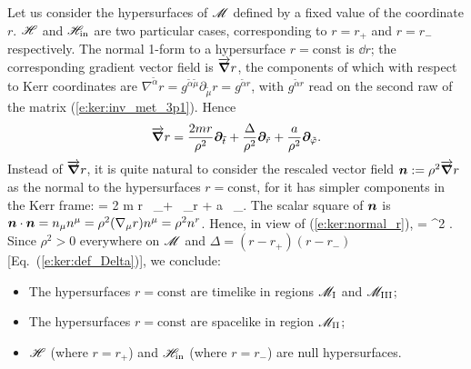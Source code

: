 Let us consider the hypersurfaces of $\mathscr{M}$ defined by a fixed value of
the coordinate $r$. $\mathscr{H}$ and $\mathscr{H}_{\rm in}$ are two particular cases,
corresponding to $r=r_+$ and $r=r_-$ respectively.
The normal 1-form to a hypersurface $r=\mathrm{const}$ is $\dd r$; the corresponding
gradient vector field is $\overrightarrow{\bm{\nabla}} r$, the components of which with respect
to Kerr coordinates are
$\nabla^{\tilde{\alpha}} r = g^{\tilde{\alpha}\tilde{\mu}} \partial_{\tilde{\mu}} r
= g^{\tilde{\alpha} r}$, with $g^{\tilde{\alpha} r}$ read on the second raw
of the matrix (\ref{e:ker:inv_met_3p1}). Hence
\[
    \overrightarrow{\bm{\nabla}} r = \frac{2m r}{\rho^2} \bm{\partial}_{\tilde t}
        +  \frac{\Delta}{\rho^2}\bm{\partial}_{\tilde r}
        +  \frac{a}{\rho^2} \bm{\partial}_{\tilde\varphi} .
\]
Instead of $ \overrightarrow{\bm{\nabla}} r$, it is quite natural to consider the rescaled vector field
$\bm{n} := \rho^2 \overrightarrow{\bm{\nabla}} r$
as the normal to the hypersurfaces $r=\mathrm{const}$, for it
has simpler components in the Kerr frame:
\be \label{e:ker:normal_r}
     = 2 m r \, \wpar_\ti + \Delta \, \wpar_{\tilde r} + a \, \wpar_\tph .
\ee
The scalar square of $\bm{n}$ is
$\bm{n}\cdot\bm{n} = n_\mu n^\mu = \rho^2 (\nabla_\mu r) n^\mu = \rho^2 n^r$.
Hence, in view of (\ref{e:ker:normal_r}),
\be
    \cdot{} = \rho^2 \Delta .
\ee
Since $\rho^2>0$ everywhere on $\mathscr{M}$ and $\Delta = (r-r_+)(r-r_-)$ [Eq.~(\ref{e:ker:def_Delta})], we conclude:
\begin{prop}
\begin{itemize}
\item The hypersurfaces $r=\mathrm{const}$ are timelike in regions $\mathscr{M}_{\rm I}$ and $\mathscr{M}_{\rm III}$;
\item The hypersurfaces $r=\mathrm{const}$ are spacelike in region $\mathscr{M}_{\rm II}$;
\item $\mathscr{H}$ (where $r=r_+$) and $\mathscr{H}_{\rm in}$ (where $r=r_-$) are null hypersurfaces.
\end{itemize}
\end{prop}

